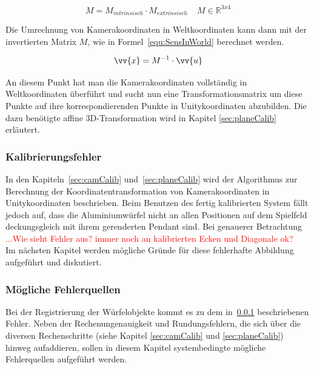 \begin{equation}
\label{equ:inAndEx}
M = M_{intrinsisch} \cdot M_{extrinsisch}~ ~ ~ ~ ~M\in \mathbb{R}^{3x4}
\end{equation}

Die Umrechnung von Kamerakoordinaten in Weltkoordinaten kann dann mit der invertierten Matrix $M$, wie in Formel~\ref{equ:SensInWorld} berechnet werden. \

\begin{equation}
\label{equ:SensInWorld}
\vv{x} = M^{-1} \cdot \vv{u}
\end{equation}

An diesem Punkt hat man die Kamerakoordinaten vollständig in Weltkoordinaten überführt und sucht nun eine Transformationsmatrix um diese Punkte auf ihre korrespondierenden Punkte in Unitykoordinaten abzubilden. Die dazu benötigte affine 3D-Transformation wird in Kapitel \ref{sec:planeCalib} erläutert.


\subsubsection{Kalibrierungsfehler} \label{sec:calibError}
In den Kapiteln~\ref{sec:camCalib} und~\ref{sec:planeCalib} wird der Algorithmus zur Berechnung der Koordinatentransformation von Kamerakoordinaten in Unitykoordinaten beschrieben. Beim Benutzen des fertig kalibrierten System fällt jedoch auf, dass die Aluminiumwürfel nicht an allen Positionen auf dem Spielfeld deckungsgleich mit ihrem gerenderten Pendant sind.  Bei genauerer Betrachtung \textcolor{red}{...Wie sieht Fehler aus? immer noch an kalibrierten Ecken und Diagonale ok?}\\
Im nächsten Kapitel werden mögliche Gründe für diese fehlerhafte Abbildung aufgeführt und diskutiert. 


\subsubsection{Mögliche Fehlerquellen} \label{sec:calibErrorSources}
Bei der Registrierung der Würfelobjekte kommt es zu dem in~\ref{sec:calibError} beschriebenen Fehler.
Neben der Rechenungenauigkeit und Rundungsfehlern, die sich über die diversen Rechenschritte (siehe Kapitel \ref{sec:camCalib} und \ref{sec:planeCalib}) hinweg aufaddieren, sollen in diesem Kapitel systembedingte mögliche Fehlerquellen aufgeführt werden. \\


